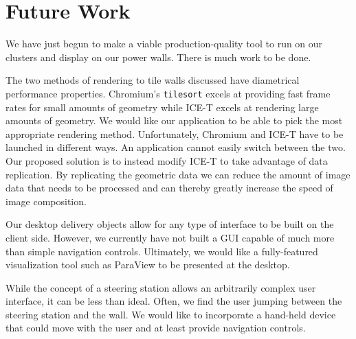 \documentclass{acmsiggraph}
\newcommand{\sticky}[1]{}
\newcommand{\cidentifier}[1]{\texttt{#1}}
\begin{document}
  \sticky{Comparison of rendering times of Chromium and ICE-T for various
  geometry sizes.  I would have it here already, but after a month I still
  don't have the Chromium stuff working on our cluster.  It's driving me
  nucking futs.}



  \section{Future Work}
  \label{sec:future_work}

  We have just begun to make a viable production-quality tool to run on our
  clusters and display on our power walls.  There is much work to be done.

  The two methods of rendering to tile walls discussed have diametrical
  performance properties.  Chromium's \cidentifier{tile\-sort} excels at
  providing fast frame rates for small amounts of geometry while ICE-T
  excels at rendering large amounts of geometry.  We would like our
  application to be able to pick the most appropriate rendering method.
  Unfortunately, Chromium and ICE-T have to be launched in different ways.
  An application cannot easily switch between the two.  Our proposed
  solution is to instead modify ICE-T to take advantage of data
  replication.  By replicating the geometric data we can reduce the amount
  of image data that needs to be processed and can thereby greatly increase
  the speed of image composition.

  Our desktop delivery objects allow for any type of interface to be built
  on the client side.  However, we currently have not built a GUI capable
  of much more than simple navigation controls.  Ultimately, we would like
  a fully-featured visualization tool such as ParaView \cite{Law01} to be
  presented at the desktop.

  While the concept of a steering station allows an arbitrarily complex
  user interface, it can be less than ideal.  Often, we find the user
  jumping between the steering station and the wall.  We would like to
  incorporate a hand-held device that could move with the user and at least
  provide navigation controls.
\end{document}
